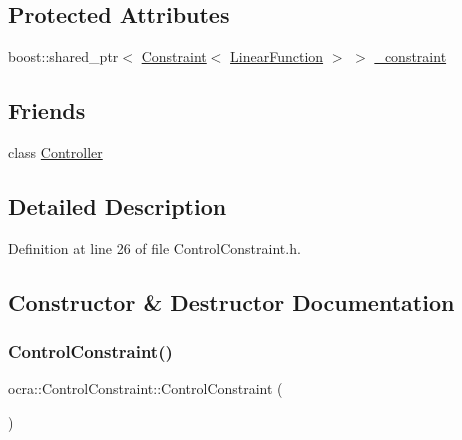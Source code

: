 \subsection*{Protected Attributes}
\begin{DoxyCompactItemize}
\item 
boost\+::shared\+\_\+ptr$<$ \hyperlink{classocra_1_1Constraint}{Constraint}$<$ \hyperlink{classocra_1_1LinearFunction}{Linear\+Function} $>$ $>$ \hyperlink{classocra_1_1ControlConstraint_a47cebded91be870b03e1dddc7b0c215b}{\+\_\+constraint}
\end{DoxyCompactItemize}
\subsection*{Friends}
\begin{DoxyCompactItemize}
\item 
class \hyperlink{classocra_1_1ControlConstraint_ac3456fd331a58b288082abca310c7a99}{Controller}
\end{DoxyCompactItemize}


\subsection{Detailed Description}


Definition at line 26 of file Control\+Constraint.\+h.



\subsection{Constructor \& Destructor Documentation}
\hypertarget{classocra_1_1ControlConstraint_a3d911f350d6a51009b670dcf061ab93e}{}\label{classocra_1_1ControlConstraint_a3d911f350d6a51009b670dcf061ab93e} 
\subsubsection{\texorpdfstring{Control\+Constraint()}{ControlConstraint()}}
{\footnotesize\ttfamily ocra\+::\+Control\+Constraint\+::\+Control\+Constraint (\begin{DoxyParamCaption}{ }\end{DoxyParamCaption})\hspace{0.3cm}{\ttfamily [inline]}}



